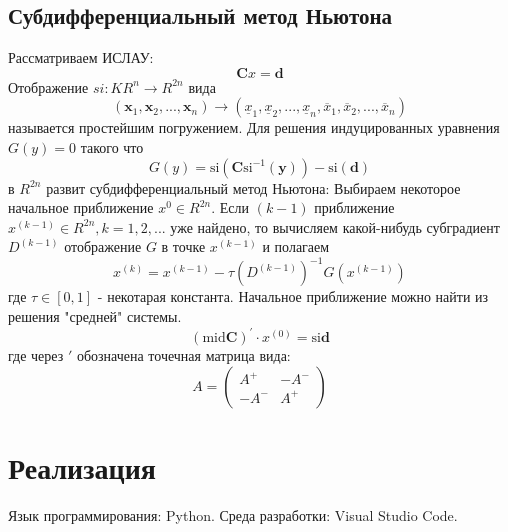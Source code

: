 \documentclass[a4paper,12pt]{article}
\begin{document}
    \subsection{Субдифференциальный метод Ньютона}
    Рассматриваем ИСЛАУ:
    \begin{equation}
        \textbf{C}x = \textbf{d}
        \label{eq:subdiffgeneraltask}
    \end{equation}
    Отображение $ si: KR^{n} \to R^{2n} $ вида
    \begin{equation}
        (\textbf{x}_{1}, \textbf{x}_{2}, ..., \textbf{x}_{n}) \to 
        (\underline{x}_{1}, \underline{x}_{2}, ..., \underline{x}_{n}, \overline{x}_{1}, \overline{x}_{2}, ..., \overline{x}_{n})
    \end{equation}
    называется простейшим погружением. \newline
    Для решения индуцированных уравнения $ G(y) = 0 $ такого что
    \begin{equation}
        G(y) = \text{si}(\textbf{C}\text{si}^{-1}(\textbf{y})) - \text{si}(\textbf{d})
    \end{equation}
    в $ R^{2n} $ развит субдифференциальный метод Ньютона: \newline
    Выбираем некоторое начальное приближение $ x^{0} \in R^{2n} $. Если $ (k - 1) $ приближение $ x^{(k - 1)} \in R^{2n}, k = 1, 2, ... $ уже найдено,
    то вычисляем какой-нибудь субградиент $ D^{(k - 1)} $ отображение $ G $ в точке $ x^{(k - 1)} $ и полагаем
    \begin{equation}
        x^{(k)} = x^{(k - 1)} - \tau(D^{(k - 1)})^{-1}G(x^{(k - 1)})
        \label{eq:itersubdiff}
    \end{equation}
    где $ \tau \in [0, 1] $ - некотарая константа.
    Начальное приближение можно найти из решения "средней" системы.
    \begin{equation}
        (\text{mid}\textbf{C})^{'} \cdot x^{(0)} = \text{si}\textbf{d}
    \end{equation}
    где через $ ' $ обозначена точечная матрица вида:
    \begin{equation}
        A = 
        \begin{pmatrix}
            A^{+} & -A^{-} \\
            -A^{-} & A^{+}    
        \end{pmatrix}
    \end{equation}
 
    \section{Реализация}
    Язык программирования: Python. Среда разработки: Visual Studio Code.
  
\end{document}
